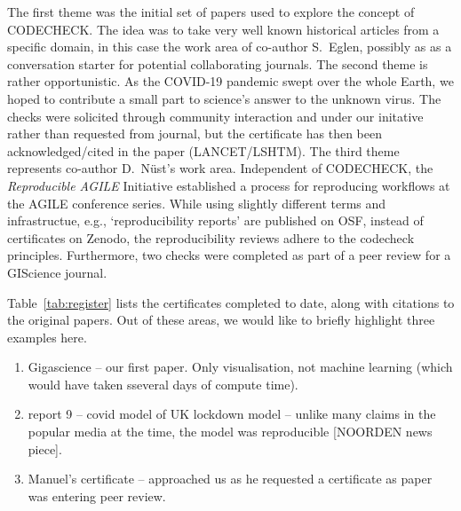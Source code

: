 \documentclass[12pt]{article}
\begin{document}
The first theme was the initial set of papers used to explore the concept
of CODECHECK. The idea was to take very well known historical articles from a 
specific domain, in this case the work area of co-author S.~Eglen, possibly 
as as a conversation starter for potential collaborating journals.
The second theme is rather opportunistic. As the COVID-19 pandemic swept
over the whole Earth, we hoped to contribute a small part to science's answer
to the unknown virus. The checks were solicited through community interaction
and under our initative rather than requested from journal, but the certificate
has then been acknowledged/cited in the paper (LANCET/LSHTM). %
The third theme represents co-author D.~N\"ust's work area.
Independent of CODECHECK, the \emph{Reproducible AGILE} Initiative \cite{reproducible_agile}
established a process for reproducing workflows at the AGILE conference
series. %
While using slightly different terms and infrastructue, e.g., `reproducibility
reports' are published on OSF, instead of certificates on Zenodo, the 
reproducibility reviews adhere to the codecheck principles.
Furthermore, two checks were completed as part of a peer review for a
GIScience journal.

Table~\ref{tab:register} lists the certificates completed to date,
along with citations to the original papers.
Out of these areas, we would like to briefly highlight three examples here.

\begin{enumerate}
\def\labelenumi{\arabic{enumi}.}
\item
  Gigascience -- our first paper. Only visualisation, not machine
  learning (which would have taken sseveral days of compute time).
\item
  report 9 -- covid model of UK lockdown model -- unlike many claims
  in the popular media at the time, the model was reproducible
  [NOORDEN news piece]. 
\item
  Manuel's certificate -- approached us as he requested a certificate
  as paper was entering peer review.
\end{enumerate}
\end{document}
